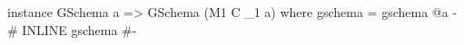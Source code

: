 \begin{code}
instance GSchema a => GSchema (M1 C _1 a) where
  gschema = gschema @a
  {-# INLINE gschema #-}
\end{code}
